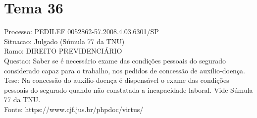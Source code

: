 \documentclass[12pt]{article}
\begin{document}
\section*{Tema 36}
Processo: PEDILEF 0052862-57.2008.4.03.6301/SP\\
Situacao: Julgado (Súmula 77 da TNU)\\
Ramo: DIREITO PREVIDENCIÁRIO\\
Questao: Saber se é necessário exame das condições pessoais do segurado considerado capaz para o trabalho, nos pedidos de concessão de auxílio-doença.\\
Tese: Na concessão do auxílio-doença é dispensável o exame das condições pessoais do segurado quando não constatada a incapacidade laboral. Vide Súmula 77 da TNU.\\
Fonte: https://www.cjf.jus.br/phpdoc/virtus/
\end{document}

